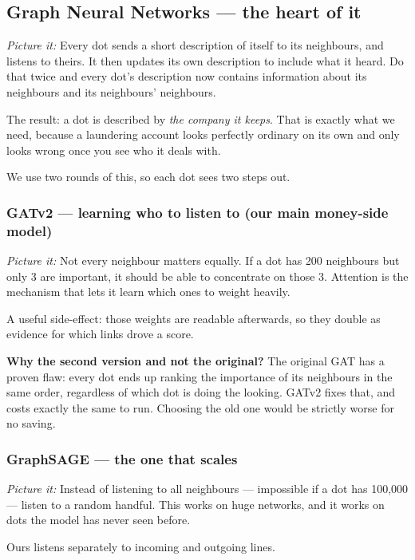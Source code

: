 \documentclass[11pt,a4paper]{article}
\newcommand{\pw}[1]{\textit{\textcolor{accent}{Picture it:}} #1}
\begin{document}
\subsection{Graph Neural Networks --- the heart of it}

\begin{plain}
\pw{Every dot sends a short description of itself to its neighbours, and listens
to theirs. It then updates its own description to include what it heard. Do that
twice and every dot's description now contains information about its neighbours
and its neighbours' neighbours.}

The result: a dot is described by \emph{the company it keeps}. That is exactly
what we need, because a laundering account looks perfectly ordinary on its own
and only looks wrong once you see who it deals with.
\end{plain}

We use two rounds of this, so each dot sees two steps out.

\subsubsection*{GATv2 --- learning who to listen to (our main money-side model)}

\pw{Not every neighbour matters equally. If a dot has 200 neighbours but only 3
are important, it should be able to concentrate on those 3. Attention is the
mechanism that lets it learn which ones to weight heavily.}

A useful side-effect: those weights are readable afterwards, so they double as
evidence for which links drove a score.

\textbf{Why the second version and not the original?} The original GAT has a
proven flaw: every dot ends up ranking the importance of its neighbours in the
same order, regardless of which dot is doing the looking. GATv2 fixes that, and
costs exactly the same to run. Choosing the old one would be strictly worse for
no saving.

\subsubsection*{GraphSAGE --- the one that scales}

\pw{Instead of listening to all neighbours --- impossible if a dot has 100{,}000
--- listen to a random handful. This works on huge networks, and it works on dots
the model has never seen before.}

Ours listens separately to incoming and outgoing lines.
\end{document}
